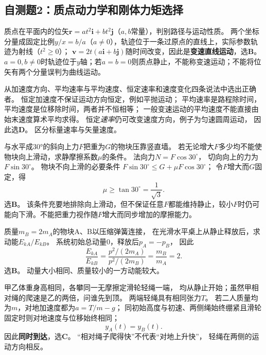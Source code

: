 
\subsection{自测题2：质点动力学和刚体力矩选择}

\problemtext 质点在平面内的位矢$\bm r=at^2\bm i+bt^2\bm j$（$a,b$常量），判别路径与运动性质。
\workings
两个坐标分量成固定比例$y/x=b/a$（$a\ne0$），轨迹位于一条过原点的直线上，实际参数轨迹为射线（$t^2\ge0$）；
$\bm v=2t(a\bm i+b\bm j)$随时间改变，因此是\textbf{变速直线运动}，选\textbf{B}。
\crosscheck $a=0,b\ne0$时轨迹位于$y$轴；若$a=b=0$则质点静止，不能称变速运动；不能将位矢有两个分量误判为曲线运动。

\problemtext 从加速度方向、平均速率与平均速度、恒定速率和速度变化四条说法中选出正确者。
\workings
恒定加速度不保证运动方向恒定，例如平抛运动；
平均速率是路程除时间，平均速度是位移除时间，两者并不恒相等；
一般变速运动的平均速度不能直接由始末速度算术平均求得。
恒定\emph{速率}仍可改变速度方向，例子为匀速圆周运动，
因此选\textbf{D}。
\crosscheck 区分标量速率与矢量速度。

\problemtext 与水平成30°的斜向上力$F$把重为$G$的物块压靠竖直墙。
若无论增大$F$多少均不能使物块向上滑动，求静摩擦系数$\mu$的条件。
\workings
法向力$N=F\cos30^\circ$，
切向向上的力为$F\sin30^\circ$。
物块不向上滑的必要条件
$F\sin30^\circ\le G+\mu F\cos30^\circ$；
令$F$增大而$G$固定，得
\[
\boxed{\mu\ge\tan30^\circ=\frac1{\sqrt3}}.
\]
选\textbf{B}。
\crosscheck 该条件充要地排除向上滑动，但不保证任意$F$都能维持静止，较小$F$时仍可能向下滑。不能把重力视作随$F$增大而同步增加的摩擦能力。

\problemtext 质量$m_B=2m_A$的物块A、B以压缩弹簧连接，
在光滑水平桌上从静止释放后，求动能$E_{kA}/E_{kB}$。
\workings
系统初始总动量0，释放后$p_A=-p_B$，
因此
\[
\boxed{\frac{E_{kA}}{E_{kB}}
=\frac{p^2/(2m_A)}{p^2/(2m_B)}
=\frac{m_B}{m_A}=2}.
\]
选\textbf{B}。
\crosscheck 动量大小相同、质量较小的一方动能较大。

\problemtext 甲乙体重身高相同，各攀同一无摩擦定滑轮轻绳一端，
均从静止开始；虽然甲相对绳的爬速是乙的两倍，问谁先到顶。
\workings
两端轻绳具有相同张力$T$。
若二人质量均为$m$，对地加速度都为$a=T/m-g$；
同初始高度与初速、两侧绳始终绷紧且滑轮固定时则对地速度与位移始终相同；
\[
\boxed{y_A(t)=y_B(t)}.
\]
因此\textbf{同时到达}，选\textbf{C}。
\crosscheck “相对绳子爬得快”不代表“对地上升快”，
轻绳在两侧的运动方向相反。

